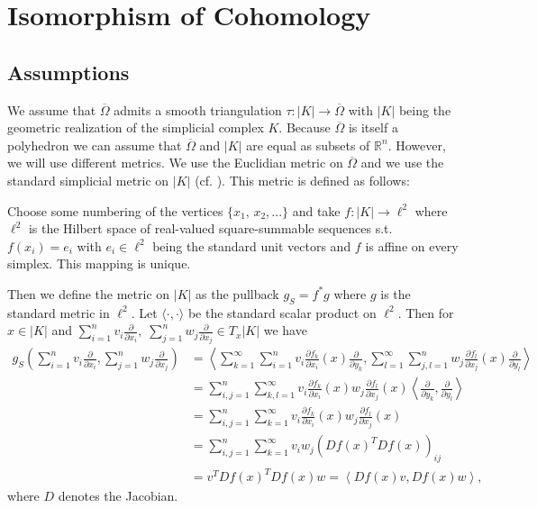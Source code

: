 \documentclass[12pt,a4paper]{article}
\theoremstyle{definition}
\newcommand{\omegabar}{\overline{\Omega}}
\newcommand{\real}{\mathbb{R}}
\begin{document}
\section{Isomorphism of Cohomology}

\subsection{Assumptions}
We assume that $\omegabar$ admits a smooth triangulation $\tau: |K|
\rightarrow \omegabar$ with $|K|$ being the geometric realization of the
simplicial complex $K$. Because $\omegabar$ is itself a polyhedron we can
assume that $\omegabar$ and $|K|$ are equal as subsets of $\real^n$. 
However, we will use different metrics. We use the Euclidian metric on 
$\omegabar$ and we use the standard simplicial metric on $|K|$ (cf. 
\cite[p.191]{goldshtein}). This metric is defined as follows:

Choose some numbering of the vertices $\{ x_1,\, x_2, ... \}$ and
take $f: |K| \rightarrow \ell^2$ where $\ell^2$ is the 
Hilbert space of real-valued square-summable sequences s.t. $f(x_i) = e_i$ 
with $e_i \in \ell^2$ being the standard unit vectors and $f$ is affine on 
every simplex. This mapping is unique.%

Then we define the metric on $|K|$ as the pullback $g_S = f^*g$ 
where $g$ is the standard metric in $\ell^2$. Let $\langle \cdot , 
\cdot \rangle$ be the standard scalar product on $\ell^2$. Then for $x \in |K|$ 
and $\sum_{i=1}^n v_i \frac{\partial}{\partial x_i}, \; 
\sum_{j=1}^n w_j \frac{\partial}{\partial x_j} \in T_x |K|$ we have 
\begin{align*}
g_S\left(\sum_{i=1}^n v_i \frac{\partial}{\partial x_i}, 
\sum_{j=1}^n w_j \frac{\partial}{\partial x_j}\right) &= 
\left\langle \sum_{k=1}^\infty \sum_{i=1}^n v_i 
\frac{\partial f_k}{\partial x_i} (x)
\frac{\partial }{\partial y_k}, 
\sum_{l=1}^\infty \sum_{j,l=1}^n w_j \frac{\partial f_l}{\partial x_j} (x)
\frac{\partial }{\partial y_l} \right\rangle \\   
&= \sum_{i,j=1}^n \sum_{k,l=1}^\infty v_i \frac{\partial f_k}{\partial x_i} (x)
w_j \frac{\partial f_l}{\partial x_j} (x) 
\left\langle \frac{\partial }{\partial y_k}, \frac{\partial }{\partial y_l} 
\right\rangle\\
&= \sum_{i,j=1}^n \sum_{k=1}^\infty v_i \frac{\partial f_k}{\partial x_i} (x)
w_j \frac{\partial f_l}{\partial x_j} (x)\\
&= \sum_{i,j=1}^n \sum_{k=1}^\infty v_i w_j \left( Df(x)^T Df(x) \right)_{ij} \\
&= v^T Df(x)^T Df(x) w = \left\langle Df(x) v, Df(x) w \right\rangle,
\end{align*}
where $D$ denotes the Jacobian.
\end{document}
